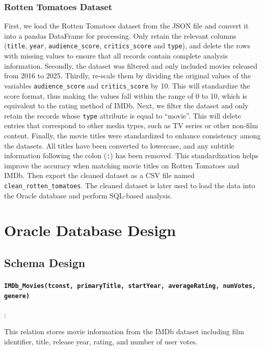 \documentclass[12pt]{article}
\begin{document}
\subsubsection{Rotten Tomatoes Dataset}
First, we load the Rotten Tomatoes dataset from the JSON file and convert it into a pandas DataFrame for processing. Only retain the relevant columns (\texttt{title}, \texttt{year}, \texttt{audience\_score}, \texttt{critics\_score} and \texttt{type}), and delete the rows with missing values to ensure that all records contain complete analysis information. Secondly, the dataset was filtered and only included movies released from 2016 to 2025. Thirdly, re-scale them by dividing the original values of the variables \texttt{audience\_score} and \texttt{critics\_score} by 10. This will standardize the score format, thus making the values fall within the range of 0 to 10, which is equivalent to the rating method of IMDb. Next, we filter the dataset and only retain the records whose \texttt{type} attribute is equal to ``movie''. This will delete entries that correspond to other media types, such as TV series or other non-film content. Finally, the movie titles were standardized to enhance consistency among the datasets. All titles have been converted to lowercase, and any subtitle information following the colon (\texttt{:}) has been removed. This standardization helps improve the accuracy when matching movie titles on Rotten Tomatoes and IMDb. Then export the cleaned dataset as a CSV file named \texttt{clean\_rotten\_tomatoes}. The cleaned dataset is later used to load the data into the Oracle database and perform SQL-based analysis.

\section{Oracle Database Design}

\subsection{Schema Design}

\paragraph{\texttt{IMDb\_Movies(tconst, primaryTitle, startYear, averageRating, numVotes, genere)}}:

This relation stores movie information from the IMDb dataset including film identifier, title, release year, rating, and number of user votes.
\end{document}
